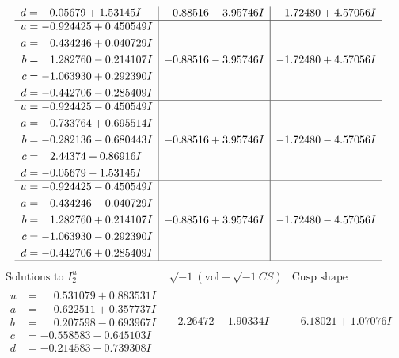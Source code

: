 \documentclass[1p]{elsarticle_modified}
\theoremstyle{definition}
\newcommand{\I}{\sqrt{-1}}
\begin{document}
$$\begin{array}{c|c|c}
\begin{aligned}
d &= -0.05679 + 1.53145 I\end{aligned}
 & -0.88516 - 3.95746 I & -1.72480 + 4.57056 I \\ \hline\begin{aligned}
u &= -0.924425 + 0.450549 I \\
a &= \phantom{-}0.434246 + 0.040729 I \\
b &= \phantom{-}1.282760 - 0.214107 I \\
c &= -1.063930 + 0.292390 I \\
d &= -0.442706 - 0.285409 I\end{aligned}
 & -0.88516 - 3.95746 I & -1.72480 + 4.57056 I \\ \hline\begin{aligned}
u &= -0.924425 - 0.450549 I \\
a &= \phantom{-}0.733764 + 0.695514 I \\
b &= -0.282136 - 0.680443 I \\
c &= \phantom{-}2.44374 + 0.86916 I \\
d &= -0.05679 - 1.53145 I\end{aligned}
 & -0.88516 + 3.95746 I & -1.72480 - 4.57056 I \\ \hline\begin{aligned}
u &= -0.924425 - 0.450549 I \\
a &= \phantom{-}0.434246 - 0.040729 I \\
b &= \phantom{-}1.282760 + 0.214107 I \\
c &= -1.063930 - 0.292390 I \\
d &= -0.442706 + 0.285409 I\end{aligned}
 & -0.88516 + 3.95746 I & -1.72480 - 4.57056 I\\
 \hline 
 \end{array}$$\newpage$$\begin{array}{c|c|c}  
\text{Solutions to }I^u_{2}& \I (\text{vol} + \sqrt{-1}CS) & \text{Cusp shape}\\
 \hline 
\begin{aligned}
u &= \phantom{-}0.531079 + 0.883531 I \\
a &= \phantom{-}0.622511 + 0.357737 I \\
b &= \phantom{-}0.207598 - 0.693967 I \\
c &= -0.558583 - 0.645103 I \\
d &= -0.214583 - 0.739308 I\end{aligned}
 & -2.26472 - 1.90334 I & -6.18021 + 1.07076 I \\ \hline\begin{aligned}

\end{aligned}
\end{array}$$
\end{document}
